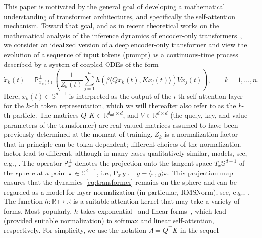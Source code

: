 \documentclass[10pt]{article}
\theoremstyle{definition}
\theoremstyle{definition}
\numberwithin{equation}{section}
\newcommand{\R}{\mathbb{R}}
\newcommand{\BBS}{\mathbb{S}}
\renewcommand{\S}{\mathbb{S}}
\renewcommand{\P}{\mathsf{P}}
\begin{document}
This paper is motivated by the general goal of developing a mathematical understanding of transformer architectures, and specifically the self-attention mechanism.
Toward that goal, and as in recent theoretical works on the mathematical analysis of the inference dynamics of encoder-only transformers~\cite{sander2022sinkformers,geshkovski2023mathematical,bruno2024emergence,castin2025unified,burger2025analysis,bruno2025multiscale,alcalde2026quantifying}, 
we consider an idealized version of a deep encoder-only transformer
and view the evolution of a sequence of input tokens (prompt)
as a continuous-time process described by a system of coupled ODEs of the form
\begin{equation}
    \label{eq:transformer}
    \Dot{x}_k(t) = \P^{\perp}_{x_k(t)} \left( \frac{1}{Z_k(t)} \sum_{j=1}^n h\left(\beta \langle Qx_k(t), K x_j(t) \rangle \right) V x_j(t) \right), \qquad k=1, \dots, n.
\end{equation}
Here, $x_k(t) \in \S^{d-1}$ is interpreted as the output of the $t$-th self-attention layer for the $k$-th token representation, which we will thereafter also refer to as the $k$-th particle.
The matrices $Q, K\in \R^{d_\text{int}\times d}$, and $V \in \R^{d\times d}$ (the query, key, and value parameters of the transformer) are real-valued matrices assumed to have been previously determined at the moment of training.
$Z_k$ is a normalization factor
that in principle can be token dependent; different choices of the normalization factor lead to  different, although in many cases qualitatively similar, models, see, e.g., \cite{geshkovski2023mathematical,burger2025analysis}.
The operator $\P_x^{\perp}$ denotes the projection onto the tangent space $T_x\BBS^{d-1}$ of the sphere at a point $x\in\BBS^{d-1}$, i.e., $\P^{\perp}_x y := y - \langle x, y \rangle x$.
This projection map ensures that the dynamics~\eqref{eq:transformer} remains on the sphere and can be regarded as a model for layer normalization (in particular, RMSNorm), see, e.g., \cite[Section~1.2]{burger2025analysis}.
The function $h:\R \mapsto \R$ is a suitable attention kernel that may take a variety of forms. Most popularly, $h$ takes exponential~\cite{vaswani2017attention} and linear forms~\cite{katharopoulos2020transformers}, which lead (provided suitable normalization) to softmax and linear self-attention, respectively.
For simplicity,
we use the notation $A = Q^\top K$ in the sequel.
\end{document}
